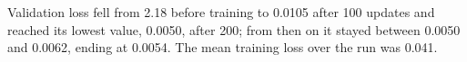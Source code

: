 Validation loss fell from 2.18 before training to 0.0105 after 100 updates and reached its lowest value, 0.0050, after 200; from then on it stayed between 0.0050 and 0.0062, ending at 0.0054. The mean training loss over the run was 0.041.
